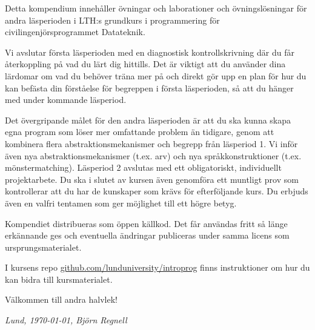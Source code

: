 


Detta kompendium innehåller övningar och laborationer och övningslösningar för andra läsperioden i LTH:s grundkurs i programmering för civilingenjörsprogrammet Datateknik.


Vi avslutar första läsperioden med en diagnostisk kontrollskrivning där du får återkoppling på vad du lärt dig hittills. Det är viktigt att du använder dina lärdomar om vad du behöver träna mer på och direkt gör upp en plan för hur du kan befästa din förståelse för begreppen i första läsperioden, så att du hänger med under kommande läsperiod.

Det övergripande målet för den andra läsperioden är att du ska kunna skapa egna program som löser mer omfattande problem än tidigare, genom att kombinera flera abstraktionsmekanismer och begrepp från läsperiod 1. Vi inför även nya abstraktionsmekanismer (t.ex. arv) och nya språkkonstruktioner (t.ex. mönstermatching). Läsperiod 2 avslutas med ett obligatoriskt, individuellt projektarbete. Du ska i slutet av kursen även genomföra ett muntligt prov som kontrollerar att du har de kunskaper som krävs för efterföljande kurs. Du erbjuds även en valfri tentamen som ger möjlighet till ett högre betyg.

Kompendiet distribueras som öppen källkod. Det får användas fritt så länge erkännande ges och eventuella ändringar publiceras under samma licens som ursprungsmaterialet. 

I kursens repo \href{http://github.com/lunduniversity/introprog}{github.com/lunduniversity/introprog} finns instruktioner om hur du kan bidra till kursmaterialet.

Välkommen till andra halvlek!

\vspace{1em}\noindent \textit{\hfill Lund, \today, Björn Regnell}
